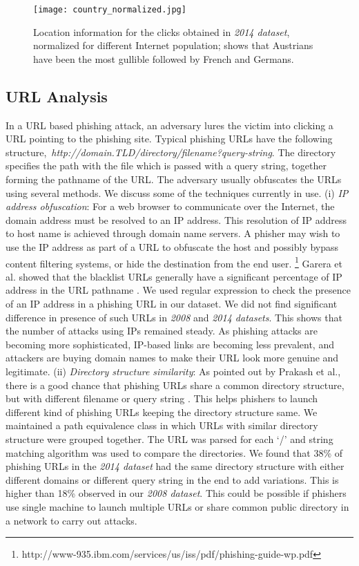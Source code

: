 \documentclass[conference]{IEEEtran}
\begin{document}
\begin{figure}[h]
\centering
\texttt{[image: country\_normalized.jpg]}
\caption{Location information for the clicks obtained in \textit{2014 dataset}, normalized for different Internet population; shows that Austrians have been the most gullible followed by French and Germans.}
\label{fig:normalized_hits}
\end{figure}

\subsection{URL Analysis}
In a URL based phishing attack, an adversary lures the victim into clicking a URL pointing to the phishing site. Typical phishing URLs have the following structure,~\textit{http://domain.TLD/directory/filename?query-string}. The directory specifies the path with the file which is passed with a query string, together forming the pathname of the URL. The adversary usually obfuscates the URLs using several methods. We discuss some of the techniques currently in use.
\newline\indent
(i) \textit{IP address obfuscation}:  For a web browser to communicate over the Internet, the domain address must be resolved to an IP address. This resolution of IP address to host name is achieved through domain name servers. A phisher may wish to use the IP address as part of a URL to obfuscate the host and possibly bypass content filtering systems, or hide the destination from the end user. \footnote{http://www-935.ibm.com/services/us/iss/pdf/phishing-guide-wp.pdf} Garera et al. showed that the blacklist URLs generally have a significant percentage of IP address in the URL pathname \cite{sujata}. We used regular expression to check the presence of an IP address in a phishing URL in our dataset. We did not find significant difference in presence of such URLs in \textit{2008} and \textit{2014 datasets}. This shows that the number of attacks using IPs remained steady. As phishing attacks are becoming more sophisticated, IP-based links are becoming less prevalent, and attackers are buying domain names to make their URL look more genuine and legitimate.
\newline\indent
(ii) \textit{Directory structure similarity}: As pointed out by Prakash et al., there is a good chance that phishing URLs share a common directory structure, but with different filename or query string \cite{phishnet}. This helps phishers to launch different kind of phishing URLs keeping the directory structure same. We maintained a path equivalence class in which URLs with similar directory structure were grouped together. The URL was parsed for each `/' and string matching algorithm was used to compare the directories. We found that 38\% of phishing URLs in the \textit{2014 dataset} had the same directory structure with either different domains or different query string in the end to add variations. This is higher than 18\% observed in our \textit{2008 dataset}. This could be possible if phishers use single machine to launch multiple URLs or share common public directory in a network to carry out attacks.
\end{document}
